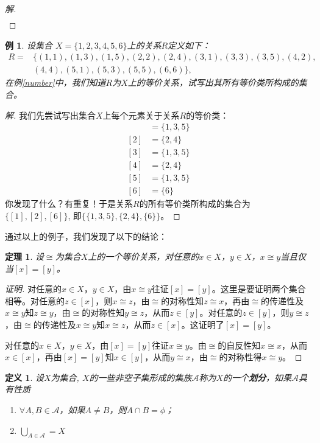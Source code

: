 \documentclass{book}[oneside]
\newtheorem{Def}{定义}[chapter]
\newtheorem{Thm}{定理}[chapter]
\newtheorem{Example}{例}[chapter]
\begin{document}
\begin{CJK*}{UTF8}{gbsn}
\begin{proof}[解]
\begin{align*}
    \end{align*}
  \end{proof}
  \begin{Example}
    设集合
    $X=\{1,2,3,4,5,6 \}$上的关系$R$定义如下：
    \begin{align*}
      R=&\{(1,1),(1,3),(1,5),(2,2),(2,4),(3,1),(3,3),(3,5),(4,2),\\
      &(4,4),(5,1),(5,3),(5,5),(6,6)\},
    \end{align*}
      在例\ref{number}中，我们知道$R$为$X$上的等价关系，试写出其所有等价类所构成的集合。
    \end{Example}
    \begin{proof}[解]
      我们先尝试写出集合$X$上每个元素关于关系$R$的等价类：
      \begin{align*}
        [1]&=\{1,3,5\}\\
        [2]&=\{2,4\}\\
        [3]&=\{1,3,5\}\\
        [4]&=\{2,4\}\\
        [5]&=\{1,3,5\}\\
        [6]&=\{6\}
      \end{align*}
      你发现了什么？有重复！于是关系$R$的所有等价类所构成的集合为$\{[1],[2],[6]\}$, 即$\{\{1,3,5\},\{2,4\},\{6\}\}$。
    \end{proof}
    通过以上的例子，我们发现了以下的结论：
    \begin{Thm}
      设$\cong$为集合$X$上的一个等价关系，对任意的$x\in X$，$y\in X$，$x\cong y$当且仅当$[x]=[y]$。
    \end{Thm}
    \begin{proof}[证明]

      对任意的$x\in X$，$y\in X$，由$x\cong y$往证$[x]=[y]$。这里是要证明两个集合相等。对任意的$z\in [x]$，则$x\cong z$，由$\cong$的对称性知$z\cong x$，再由$\cong$的传递性及$x\cong y$知$z\cong y$，由$\cong$的对称性知$y\cong z$，从而$z\in [y]$。对任意的$z\in [y]$，则$y\cong z$，由$\cong$的传递性及$x\cong y$知$x\cong z$，从而$z\in [x]$。这证明了$[x]=[y]$。

      对任意的$x\in X$，$y\in X$，由$[x]=[y]$往证$x\cong y$。由$\cong$的自反性知$x\cong x$，从而$x\in [x]$，再由$[x]=[y]$知$x\in [y]$，从而$y\cong x$，由$\cong$的对称性得$x\cong y$。
    \end{proof}
   \begin{Def}
    设$X$为集合, $X$的一些非空子集形成的集族$\mathscr{A}$称为$X$的一个{\bfseries 划分}，如果$\mathscr{A}$具有性质
    \begin{enumerate}
    \item $\forall A, B \in \mathscr{A}$，如果$A \neq B$，则$A \cap B = \phi$；
      \item $\bigcup_{A \in \mathscr{A}} = X$
    \end{enumerate}
  \end{Def}


\end{CJK*}
\end{document}
